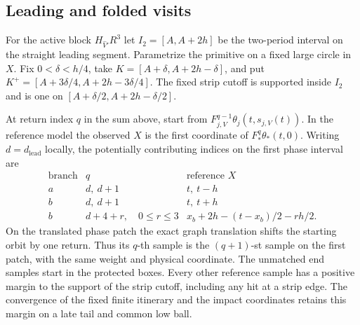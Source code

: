 \documentclass[11pt]{article}
\begin{document}
\subsection{Leading and folded visits}\label{leading-and-folded-visits}

For the active block \(H_{\widehat V'}R^3\) let \(I_2=[A,A+2h]\) be
the two-period interval on the straight leading segment. Parametrize
the primitive on a fixed large circle in \(X\). Fix \(0<\delta<h/4\),
take \(K=[A+\delta,A+2h-\delta]\), and put
\(K^+=[A+3\delta/4,A+2h-3\delta/4]\).
The fixed strip cutoff is supported inside \(I_2\) and is one on
\([A+\delta/2,A+2h-\delta/2]\).

At return index \(q\) in the sum above, start from
\(F_{j,V}^{q-1}\theta_j(t,s_{j,V}(t))\). In the reference model the
observed \(X\) is the first coordinate of \(F_*^q\theta_*(t,0)\).
Writing \(d=d_{\mathrm{lead}}\) locally, the potentially contributing
indices on the first phase interval are
\[
\begin{array}{ccl}
\text{branch}& q & \text{reference }X\\
a & d,\ d+1 & t,\ t-h\\
b & d,\ d+1 & t,\ t+h\\
b & d+4+r,\quad 0\le r\le 3
    & x_b+2h-(t-x_b)/2-rh/2 .
\end{array}
\]
On the translated phase patch the exact graph translation shifts the
starting orbit by one return. Thus its \(q\)-th sample is the
\((q+1)\)-st sample on the first patch, with the same weight and physical
coordinate. The unmatched end samples start in the protected boxes.
Every other reference sample has a positive margin to the support
of the strip cutoff, including any hit at a strip edge. The
convergence of the fixed finite itinerary and the impact coordinates
retains this margin on a late tail and common low ball.
\end{document}
